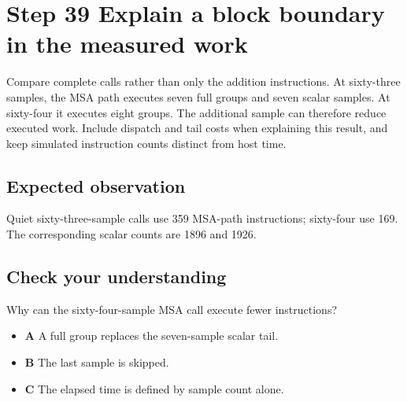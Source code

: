 \section{Step 39 Explain a block boundary in the measured work}\label{pcm-s39}

Compare complete calls rather than only the addition instructions. At sixty-three samples, the MSA path executes seven full groups and seven scalar samples. At sixty-four it executes eight groups. The additional sample can therefore reduce executed work. Include dispatch and tail costs when explaining this result, and keep simulated instruction counts distinct from host time.

\subsection{Expected observation}
Quiet sixty-three-sample calls use 359 MSA-path instructions; sixty-four use 169. The corresponding scalar counts are 1896 and 1926.

\subsection{Check your understanding}
Why can the sixty-four-sample MSA call execute fewer instructions?

\begin{itemize}
  \item \textbf{A} A full group replaces the seven-sample scalar tail.
  \item \textbf{B} The last sample is skipped.
  \item \textbf{C} The elapsed time is defined by sample count alone.
\end{itemize}
